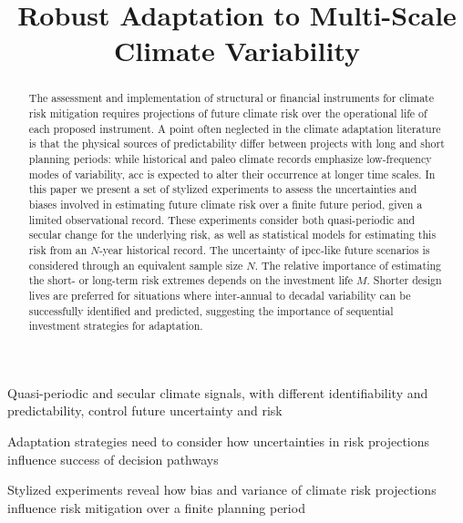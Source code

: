 \documentclass[
  draft,
  linenumbers
]{agujournal2019}
\begin{document}
\title{Robust Adaptation to Multi-Scale Climate Variability}

\begin{keypoints}
  \item Quasi-periodic and secular climate signals, with different identifiability and predictability, control future uncertainty and risk
  \item Adaptation strategies need to consider how uncertainties in risk projections influence success of decision pathways
  \item Stylized experiments reveal how bias and variance of climate risk projections influence risk mitigation over a finite planning period
\end{keypoints}

\begin{abstract}
  The assessment and implementation of structural or financial instruments for climate risk mitigation requires projections of future climate risk over the operational life of each proposed instrument.
  A point often neglected in the climate adaptation literature is that the physical sources of predictability differ between projects with long and short planning periods: while historical and paleo climate records emphasize low-frequency modes of variability, \acrlong{acc} is expected to alter their occurrence at longer time scales.
  In this paper we present a set of stylized experiments to assess the uncertainties and biases involved in estimating future climate risk over a finite future period, given a limited observational record.
  These experiments consider both quasi-periodic and secular change for the underlying risk, as well as statistical models for estimating this risk from an $N$-year historical record.
  The uncertainty of \acrshort{ipcc}-like future scenarios is considered through an equivalent sample size $N$. 
  The relative importance of estimating the short- or long-term risk extremes depends on the investment life $M$.
  Shorter design lives are preferred for situations where inter-annual to decadal variability can be successfully identified and predicted, suggesting the importance of sequential investment strategies for adaptation.
\end{abstract}
\end{document}
